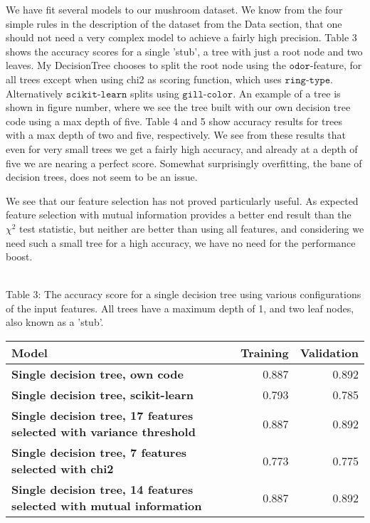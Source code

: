 \documentclass[11pt]{article}
\begin{document}
We have fit several models to our mushroom dataset. We know from the four simple rules in the description of the dataset from the Data section, that one should not need a very complex model to achieve a fairly high precision. Table 3 shows the accuracy scores for a single 'stub', a tree with just a root node and two leaves. My DecisionTree chooses to split the root node using the $\texttt{odor}$-feature, for all trees except when using chi2 as scoring function, which uses $\texttt{ring-type}$. Alternatively $\texttt{scikit-learn}$ splits using $\texttt{gill-color}$. An example of a tree is shown in figure number, where we see the tree built with our own decision tree code using a max depth of five. Table 4 and 5 show accuracy results for trees with a max depth of two and five, respectively. We see from these results that even for very small trees we get a fairly high accuracy, and already at a depth of five we are nearing a perfect score. Somewhat surprisingly overfitting, the bane of decision trees, does not seem to be an issue.

We see that our feature selection has not proved particularly useful. As expected feature selection with mutual information provides a better end result than the \(\chi^2\) test statistic, but neither are better than using all features, and considering we need such a small tree for a high accuracy, we have no need for the performance boost.

{ \hspace*{\fill} \\}
Table 3: The accuracy score for a single decision tree using various configurations of the input features. All trees have a maximum depth of 1, and two leaf nodes, also known as a 'stub'.
\begin{table}[h!]
	\begin{center}
		\label{tab:table1}
		\begin{tabular}{l|r|r}
        \textbf{Model}                                                      		   & \textbf{Training} & \textbf{Validation}
        \\ \hline
		\textbf{Single decision tree, own code}                                        & 0.887             & 0.892               \\ \hline
		\textbf{Single decision tree, scikit-learn}                                    & 0.793             & 0.785               \\ \hline
		\textbf{Single decision tree, 17 features selected with variance threshold}    & 0.887             & 0.892               \\ \hline
		\textbf{Single decision tree, 7 features selected with chi2}                   & 0.773             & 0.775               \\ \hline
		\textbf{Single decision tree, 14 features selected with mutual information}    & 0.887             & 0.892               \\ \hline
		\end{tabular}
	\end{center}
\end{table}
\end{document}
